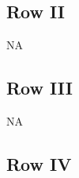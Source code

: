 \documentclass[9pt]{article}
\numberwithin{equation}{section}
\begin{document}
\subsection{Row II}
\textsc{NA}
\subsection{Row III}
\textsc{NA}
\subsection{Row IV}

\end{document}
